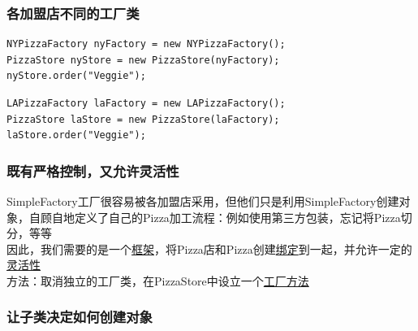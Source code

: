 \documentclass[compress]{beamer}
\begin{document}
\begin{frame}[fragile]
\frametitle{各加盟店不同的工厂类}
\begin{Verbatim}[label=纽约风味的工厂]
NYPizzaFactory nyFactory = new NYPizzaFactory(); 
PizzaStore nyStore = new PizzaStore(nyFactory); 
nyStore.order("Veggie");
\end{Verbatim}

\vspace*{2ex}
\begin{Verbatim}[label=洛杉矶风味的工厂]
LAPizzaFactory laFactory = new LAPizzaFactory(); 
PizzaStore laStore = new PizzaStore(laFactory); 
laStore.order("Veggie");
\end{Verbatim}
\end{frame}

\begin{frame}
\frametitle{既有严格控制，又允许灵活性}
SimpleFactory工厂很容易被各加盟店采用，但他们只是利用SimpleFactory创建对象，自顾自地定义了自己的Pizza加工流程：例如使用第三方包装，忘记将Pizza切分，等等\\[2ex]

因此，我们需要的是一个\uline{框架}，将Pizza店和Pizza创建\uline{绑定}到一起，并允许一定的\uline{灵活性}\\[2ex]

方法：取消独立的工厂类，在PizzaStore中设立一个\uline{工厂方法}
\end{frame}

\begin{frame}
\frametitle{让子类决定如何创建对象}
\end{frame}
\end{document}
